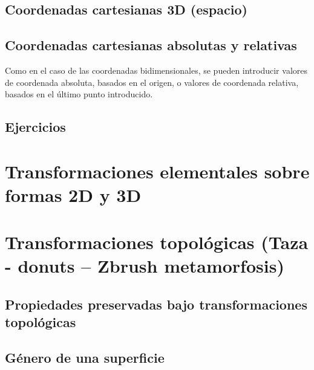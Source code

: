 \documentclass[
  11pt,
]{krantz}
\theoremstyle{definition}
\theoremstyle{definition}
\theoremstyle{definition}
\theoremstyle{definition}
\theoremstyle{remark}
\begin{document}
\hypertarget{coordenadas-cartesianas-3d-espacio}{%
\subsection{Coordenadas cartesianas 3D (espacio)}\label{coordenadas-cartesianas-3d-espacio}}

\hypertarget{coordenadas-cartesianas-absolutas-y-relativas}{%
\subsection{Coordenadas cartesianas absolutas y relativas}\label{coordenadas-cartesianas-absolutas-y-relativas}}

Como en el caso de las coordenadas bidimensionales, se pueden introducir valores de coordenada absoluta, basados en el origen, o valores de coordenada relativa, basados en el último punto introducido.

\hypertarget{ejercicios}{%
\subsection{Ejercicios}\label{ejercicios}}

\hypertarget{transformaciones-elementales-sobre-formas-2d-y-3d}{%
\section{Transformaciones elementales sobre formas 2D y 3D}\label{transformaciones-elementales-sobre-formas-2d-y-3d}}

\hypertarget{transformaciones-topoluxf3gicas-taza---donuts-zbrush-metamorfosis}{%
\section{Transformaciones topológicas (Taza - donuts -- Zbrush metamorfosis)}\label{transformaciones-topoluxf3gicas-taza---donuts-zbrush-metamorfosis}}

\hypertarget{propiedades-preservadas-bajo-transformaciones-topoluxf3gicas}{%
\subsection{Propiedades preservadas bajo transformaciones topológicas}\label{propiedades-preservadas-bajo-transformaciones-topoluxf3gicas}}

\hypertarget{guxe9nero-de-una-superficie}{%
\subsection{Género de una superficie}\label{guxe9nero-de-una-superficie}}
\end{document}
